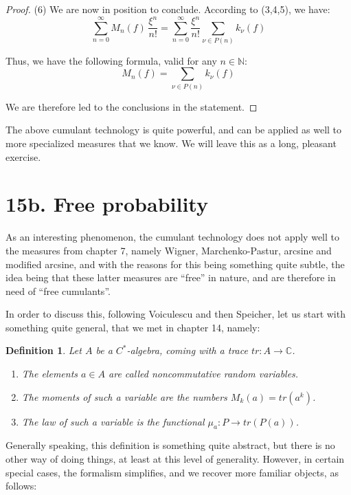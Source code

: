 \documentclass[12pt]{amsbook}
\newtheorem{definition}[theorem]{Definition}
\begin{document}
\begin{proof}
(6) We are now in position to conclude. According to (3,4,5), we have:
$$\sum_{n=0}^\infty M_n(f)\,\frac{\xi^n}{n!}=\sum_{n=0}^\infty\frac{\xi^n}{n!}\sum_{\nu\in P(n)}k_\nu(f)$$

Thus, we have the following formula, valid for any $n\in\mathbb N$:
$$M_n(f)=\sum_{\nu\in P(n)}k_\nu(f)$$

We are therefore led to the conclusions in the statement.
\end{proof}

The above cumulant technology is quite powerful, and can be applied as well to more specialized measures that we know. We will leave this as a long, pleasant exercise.

\section*{15b. Free probability} 

As an interesting phenomenon, the cumulant technology does not apply well to the measures from chapter 7, namely Wigner, Marchenko-Pastur, arcsine and modified arcsine, and with the reasons for this being something quite subtle, the idea being that these latter measures are ``free'' in nature, and are therefore in need of ``free cumulants''.

\bigskip

In order to discuss this, following Voiculescu and then Speicher, let us start with something quite general, that we met in chapter 14, namely:

\begin{definition}
Let $A$ be a $C^*$-algebra, coming with a trace $tr:A\to\mathbb C$.
\begin{enumerate}
\item The elements $a\in A$ are called noncommutative random variables.

\item The moments of such a variable are the numbers $M_k(a)=tr(a^k)$.

\item The law of such a variable is the functional $\mu_a:P\to tr(P(a))$.
\end{enumerate}
\end{definition}

Generally speaking, this definition is something quite abstract, but there is no other way of doing things, at least at this level of generality. However, in certain special cases, the formalism simplifies, and we recover more familiar objects, as follows:
\end{document}
